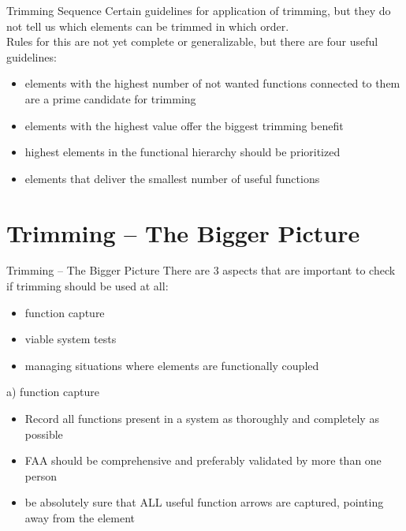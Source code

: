 \documentclass{beamer}
\begin{document}
	\begin{frame}{Trimming Sequence}
		Certain guidelines for application of trimming, but they do not tell us which elements can be trimmed in which order.\\
		Rules for this are not yet complete or generalizable, but there are four useful guidelines:
		\begin{itemize}
			\item elements with the highest number of not wanted functions connected to them are a prime candidate for trimming
			\item elements with the highest value offer the biggest trimming benefit
			\item highest elements in the functional hierarchy should be prioritized
			\item elements that deliver the smallest number of useful functions
		\end{itemize}
	\end{frame}
	
	\section{Trimming – The Bigger Picture}

	\begin{frame}{Trimming – The Bigger Picture}
		There are 3 aspects that are important to check if trimming should be used at all:
		\begin{itemize}
			\item[a)] function capture
            \item[b)] viable system tests
            \item[c)] managing situations where elements are functionally coupled
		\end{itemize}
	\end{frame}

	\begin{frame}{a) function capture}
		\begin{itemize}
			\item Record all functions present in a system as thoroughly and completely as possible
			\item FAA should be comprehensive and preferably validated by more than one person
			\item be absolutely sure that ALL useful function arrows are captured, pointing away from the element
		\end{itemize}
	\end{frame}
\end{document}
